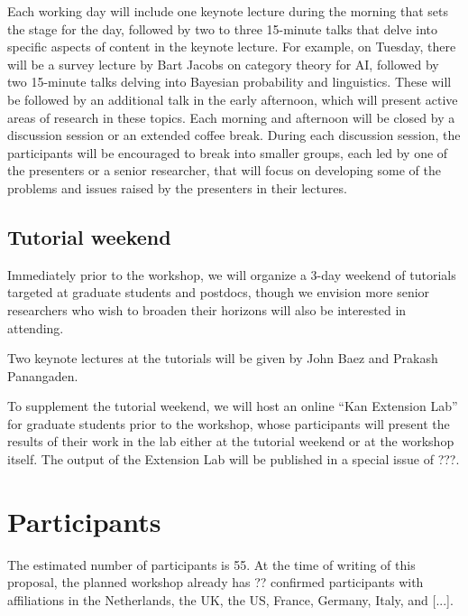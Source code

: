 \documentclass{article}
\newcommand{\redout}[1]{{\color{red}#1}}
\begin{document}
Each working day will include one keynote lecture during the morning that sets the stage for the day, followed by two to three 15-minute talks that delve into specific aspects of content in the keynote lecture. For example, on Tuesday, there will be a survey lecture by \redout{Bart Jacobs} on category theory for AI, followed by two 15-minute talks delving into Bayesian probability and linguistics. These will be followed by an additional talk in the early afternoon, which will present active areas of research in these topics. Each morning and afternoon will be closed by a discussion session or an extended coffee break. During each discussion session, the participants will be encouraged to break into smaller groups, each led by one of the presenters or a senior researcher, that will focus on developing some of the problems and issues raised by the presenters in their lectures.


\subsection{Tutorial weekend}
Immediately prior to the workshop, we will organize a 3-day weekend of tutorials targeted at graduate students and postdocs, though we envision more senior researchers who wish to broaden their horizons will also be interested in attending.

Two keynote lectures at the tutorials will be given by \redout{John Baez and Prakash Panangaden}.

To supplement the tutorial weekend, we will host an online ``Kan Extension Lab'' for graduate students prior to the workshop, whose participants will present the results of their work in the lab either at the tutorial weekend or at the workshop itself. The output of the Extension Lab will be published in a special issue of \redout{???}.

\section{Participants}
The estimated number of participants is 55. At the time of writing of this proposal, the planned workshop already has ?? confirmed participants with affiliations in the Netherlands, the UK, the US, France, Germany, Italy, and [...].
\end{document}
